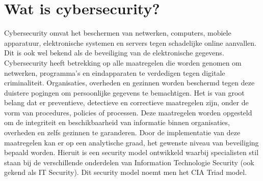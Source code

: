 \section{Wat is cybersecurity?}
Cybersecurity omvat het beschermen van netwerken, computers, mobiele apparatuur, elektronische systemen en servers tegen schadelijke online aanvallen. Dit is ook wel bekend als de beveiliging van de elektronische gegevens. Cybersecurity heeft betrekking op alle maatregelen die worden genomen om netwerken, programma’s en eindapparaten te verdedigen tegen digitale criminaliteit. Organisaties, overheden en gezinnen worden beschermd tegen deze duistere pogingen om persoonlijke gegevens te bemachtigen.
\newline
\newline 
Het is van groot belang dat er preventieve, detectieve en correctieve maatregelen zijn, onder de vorm van procedures, policies of processen. Deze maatregelen worden opgesteld om de integriteit en beschikbaarheid van informatie binnen organisaties, overheden en zelfs gezinnen te garanderen. Door de implementatie van deze maatregelen kan er op een analytische graad, het gewenste niveau van beveiliging bepaald worden. Hieruit is een security model ontwikkeld waarbij specialisten stil staan bij de verschillende onderdelen van Information Technologie Security (ook gekend als IT Security). Dit security model noemt men het CIA Triad model. 

